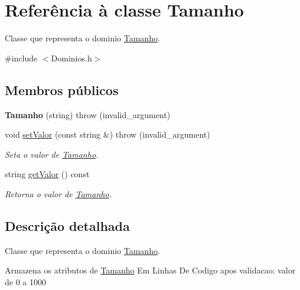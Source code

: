 \hypertarget{class_tamanho}{
\section{\-Referência à classe \-Tamanho}
\label{class_tamanho}
}


\-Classe que representa o dominio \hyperlink{class_tamanho}{\-Tamanho}.  




{\ttfamily \#include $<$\-Dominios.\-h$>$}

\subsection*{\-Membros públicos}
\begin{DoxyCompactItemize}
\item 
\hypertarget{class_tamanho_ade51fc817d5d3e512942bf82e1626ae9}{
{\bfseries \-Tamanho} (string)  throw (invalid\-\_\-argument)}
\label{class_tamanho_ade51fc817d5d3e512942bf82e1626ae9}

\item 
void \hyperlink{class_tamanho_a28be3ebbc37045aeac43bf35f37927a7}{set\-Valor} (const string \&)  throw (invalid\-\_\-argument)
\begin{DoxyCompactList}\small\item\em \-Seta o valor de \hyperlink{class_tamanho}{\-Tamanho}. \end{DoxyCompactList}\item 
string \hyperlink{class_tamanho_af41e8a0b80bc50c751e037423a072234}{get\-Valor} () const 
\begin{DoxyCompactList}\small\item\em \-Retorna o valor de \hyperlink{class_tamanho}{\-Tamanho}. \end{DoxyCompactList}\end{DoxyCompactItemize}


\subsection{\-Descrição detalhada}
\-Classe que representa o dominio \hyperlink{class_tamanho}{\-Tamanho}. 

\-Armazena os atributos de \hyperlink{class_tamanho}{\-Tamanho} \-Em \-Linhas \-De \-Codigo apos validacao\-: valor de 0 a 1000 

